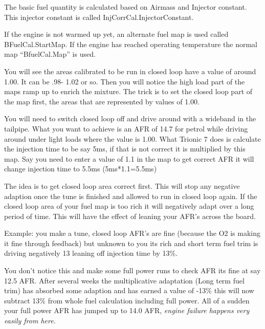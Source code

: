 \documentclass[11pt,a4paper]{book}
\begin{document}
The basic fuel quantity is calculated based on Airmass and Injector constant. This injector constant is
called InjCorrCal.InjectorConstant.
\begin{figure}[<+htpb+>]
    \centering
    \missingfigure{}
    \caption{}
    \label{fig:}
\end{figure}
If the engine is not warmed up yet, an alternate fuel map is used called BFuelCal.StartMap. If the
engine has reached operating temperature the normal map “BfuelCal.Map” is used.
\begin{figure}[<+htpb+>]
    \centering
    \missingfigure{}
    \caption{}
    \label{fig:}
\end{figure}


You will see the areas calibrated to be run in closed loop have a value of around 1.00. It can be .98-
1.02 or so. Then you will notice the high load part of the maps ramp up to enrich the mixture.
The trick is to set the closed loop part of the map first, the areas that are represented by values of
1.00.

You will need to switch closed loop off and drive around with a wideband in the tailpipe.
What you want to achieve is an AFR of 14.7 for petrol while driving around under light loads where
the value is 1.00. What Trionic 7 does is calculate the injection time to be say 5ms, if that is not correct it is
multiplied by this map. Say you need to enter a value of 1.1 in the map to get correct AFR it will
change injection time to 5.5ms (5ms*1.1=5.5ms)

The idea is to get closed loop area correct first. This will stop any negative adaption once the tune is
finished and allowed to run in closed loop again. If the closed loop area of your fuel map is too rich it
will negatively adapt over a long period of time. This will have the effect of leaning your AFR's across
the board.

Example: you make a tune, closed loop AFR's are fine (because the O2 is making it fine through
feedback) but unknown to you its rich and short term fuel trim is driving negatively 13%
leaning off injection time by 13\%.

You don’t notice this and make some full power runs to check AFR its fine at say 12.5 AFR.
After several weeks the multiplicative adaptation (Long term fuel trim) has absorbed some adaption
and has earned a value of -13\% this will now subtract 13\% from whole fuel calculation including full
power. All of a sudden your full power AFR has jumped up to 14.0 AFR, \emph{engine failure happens
very easily from here}.
\end{document}
